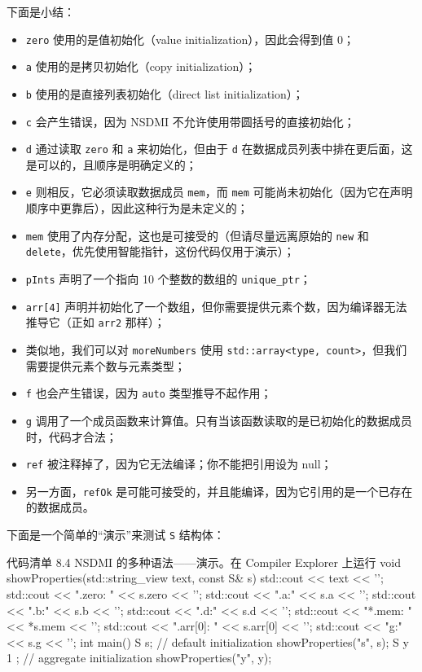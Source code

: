 下面是小结：

\begin{itemize}
\item \texttt{zero} 使用的是值初始化（value initialization），因此会得到值 0；
\item \texttt{a} 使用的是拷贝初始化（copy initialization）；
\item \texttt{b} 使用的是直接列表初始化（direct list initialization）；
\item \texttt{c} 会产生错误，因为 NSDMI 不允许使用带圆括号的直接初始化；
\item \texttt{d} 通过读取 \texttt{zero} 和 \texttt{a} 来初始化，但由于 \texttt{d} 在数据成员列表中排在更后面，这是可以的，且顺序是明确定义的；
\item \texttt{e} 则相反，它必须读取数据成员 \texttt{mem}，而 \texttt{mem} 可能尚未初始化（因为它在声明顺序中更靠后），因此这种行为是未定义的；
\item \texttt{mem} 使用了内存分配，这也是可接受的（但请尽量远离原始的 \texttt{new} 和 \texttt{delete}，优先使用智能指针，这份代码仅用于演示）；
\item \texttt{pInts} 声明了一个指向 10 个整数的数组的 \texttt{unique\_ptr}；
\item \texttt{arr[4]} 声明并初始化了一个数组，但你需要提供元素个数，因为编译器无法推导它（正如 \texttt{arr2} 那样）；
\item 类似地，我们可以对 \texttt{moreNumbers} 使用 \texttt{std::array<type, count>}，但我们需要提供元素个数与元素类型；
\item \texttt{f} 也会产生错误，因为 \texttt{auto} 类型推导不起作用；
\item \texttt{g} 调用了一个成员函数来计算值。只有当该函数读取的是已初始化的数据成员时，代码才合法；
\item \texttt{ref} 被注释掉了，因为它无法编译；你不能把引用设为 null；
\item 另一方面，\texttt{refOk} 是可能可接受的，并且能编译，因为它引用的是一个已存在的数据成员。
\end{itemize}

下面是一个简单的“演示”来测试 \texttt{S} 结构体：

\begin{codeboxt}[cpp]{代码清单 8.4 NSDMI 的多种语法——演示。在 Compiler Explorer 上运行}
void showProperties(std::string_view text, const S& s) {
    std::cout << text << '\n';
    std::cout << ".zero: " << s.zero << '\n';
    std::cout << ".a:\n" << s.a << '\n';
    std::cout << ".b:\n" << s.b << '\n';
    std::cout << ".d:\n" << s.d << '\n';
    std::cout << "*.mem: " << *s.mem << '\n';
    std::cout << ".arr[0]: " << s.arr[0] << '\n';
    std::cout << "g:\n" << s.g << '\n';
}
int main() {
    S s;
    // default initialization
    showProperties("s", s);
    S y { 1 }; // aggregate initialization
    showProperties("y", y);
}
\end{codeboxt}

